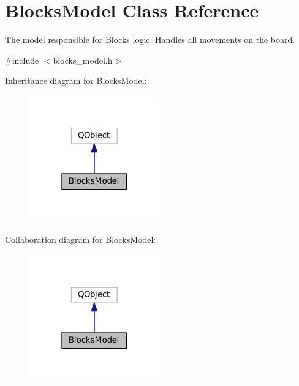 \hypertarget{class_blocks_model}{}\section{Blocks\+Model Class Reference}
\label{class_blocks_model}


The model responsible for Blocks logic. Handles all movements on the board.  




{\ttfamily \#include $<$blocks\+\_\+model.\+h$>$}



Inheritance diagram for Blocks\+Model\+:
\nopagebreak
\begin{figure}[H]
\begin{center}
\leavevmode
\includegraphics[width=159pt]{class_blocks_model__inherit__graph}
\end{center}
\end{figure}


Collaboration diagram for Blocks\+Model\+:
\nopagebreak
\begin{figure}[H]
\begin{center}
\leavevmode
\includegraphics[width=159pt]{class_blocks_model__coll__graph}
\end{center}
\end{figure}
